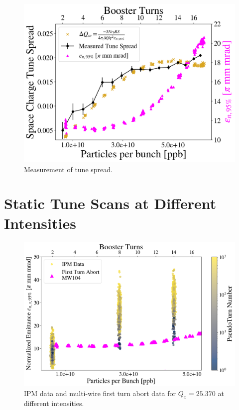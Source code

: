 
\begin{figure}[H]
    \centering
    \includegraphics[width=\columnwidth]{chapter6/tune_spread.png}
    \caption{Measurement of tune spread.}
    \label{fig:tunespread}
\end{figure}

\section{Static Tune Scans at Different Intensities}

\begin{figure}[H]
    \centering
    \includegraphics[width=\columnwidth]{chapter6/25370_scatter.png}
    \caption{IPM data and multi-wire first turn abort data for $Q_x=25.370$ at different intensities.}
    \label{fig:25370_scatter}
\end{figure}


